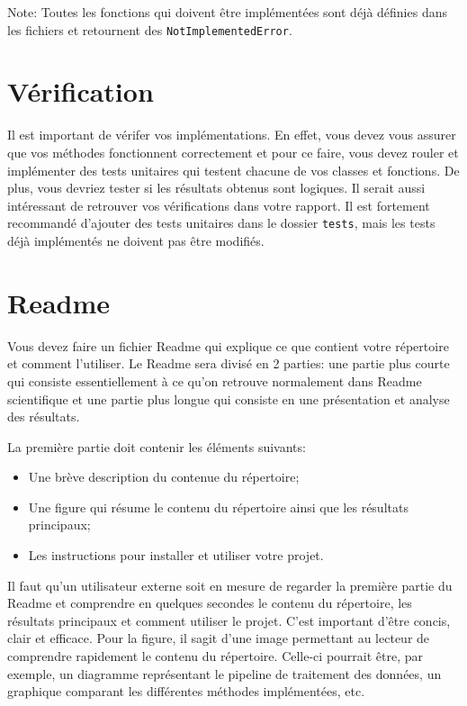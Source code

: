 \documentclass[12pt, letterpaper]{article}
\numberwithin{table}{section}
\numberwithin{figure}{section}
\numberwithin{equation}{section}
\begin{document}
\bigskip

\noindent Note: Toutes les fonctions qui doivent être implémentées sont déjà définies dans les fichiers
et retournent des \texttt{NotImplementedError}.


\section{Vérification}\label{sec:verification}

\noindent Il est important de vérifer vos implémentations.
En effet, vous devez vous assurer que vos méthodes fonctionnent correctement et pour ce faire, vous devez rouler et
implémenter des tests unitaires qui testent chacune de vos classes et fonctions.
De plus, vous devriez tester si les résultats obtenus sont logiques.
Il serait aussi intéressant de retrouver vos vérifications dans votre rapport.
Il est fortement recommandé d'ajouter des tests unitaires dans le dossier \texttt{tests}, mais les tests déjà
implémentés ne doivent pas être modifiés.


\section{Readme}\label{sec:Readme}

\noindent Vous devez faire un fichier Readme qui explique ce que contient votre répertoire et comment l'utiliser.
Le Readme sera divisé en 2 parties: une partie plus courte qui consiste essentiellement à ce qu'on retrouve normalement
dans Readme scientifique et une partie plus longue qui consiste en une présentation et analyse des résultats.

\bigskip

\noindent La première partie doit contenir les éléments suivants:
\begin{itemize}
    \item Une brève description du contenue du répertoire;
    \item Une figure qui résume le contenu du répertoire ainsi que les résultats principaux;
    \item Les instructions pour installer et utiliser votre projet.
\end{itemize}
Il faut qu'un utilisateur externe soit en mesure de regarder la première partie du Readme et comprendre en quelques
secondes le contenu du répertoire, les résultats principaux et comment utiliser le projet.
C'est important d'être concis, clair et efficace.
Pour la figure, il sagit d'une image permettant au lecteur de comprendre rapidement le contenu du répertoire.
Celle-ci pourrait être, par exemple, un diagramme représentant le pipeline de traitement des données, un graphique
comparant les différentes méthodes implémentées, etc.
\end{document}
